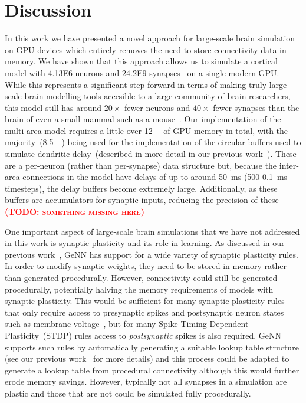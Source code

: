 \documentclass[9pt,twocolumn,twoside,lineno]{pnas-new}
\newcommand{\todo}[1]{\textbf{\textsc{\textcolor{red}{(TODO: #1)}}}}
\begin{document}
\section*{Discussion}
In this work we have presented a novel approach for large-scale brain simulation on GPU devices which entirely removes the need to store connectivity data in memory.
We have shown that this approach allows us to simulate a cortical model with \num{4.13E6} neurons and \num{24.2E9} synapses~\citep{Schmidt2018a,Schmidt2018} on a single modern GPU.
While this represents a significant step forward in terms of making truly large-scale brain modelling tools accesible to a large community of brain researchers, this model still has around $20\times$ fewer neurons and $40\times$ fewer synapses than the brain of even a small mammal such as a mouse~\citep{Herculano-Houzel2010}.
Our implementation of the multi-area model requires a little over \SI{12}{\giga\byte} of GPU memory in total, with the majority~(\SI{8.5}{\giga\byte}) being used for the implementation of the circular buffers used to simulate dendritic delay~(described in more detail in our previous work~\citep{Knight2018}).
These are a per-neuron (rather than per-synapse) data structure but, because the inter-area connections in the model have delays of up to around \SI{50}{\milli\second} (500 \SI{0.1}{\milli\second} timesteps), the delay buffers become extremely large.
Additionally, as these buffers are accumulators for synaptic inputs, reducing the precision of these \todo{something missing here}

One important aspect of large-scale brain simulations that we have not addressed in this work is synaptic plasticity and its role in learning.
As discussed in our previous work~\citep{Knight2018}, GeNN has support for a wide variety of synaptic plasticity rules.
In order to modify synaptic weights, they need to be stored in memory rather than generated procedurally.
However, connectivity could still be generated procedurally, potentially halving the memory requirements of models with synaptic plasticity.
This would be sufficient for many synaptic plasticity rules that only require access to presynaptic spikes and postsynaptic neuron states such as membrane voltage~\cite{Brader2007,Clopath2010c}, but for many Spike-Timing-Dependent Plasticity~(STDP) rules access to \emph{postsynaptic} spikes is also required.
GeNN supports such rules by automatically generating a suitable lookup table structure (see our previous work~\citep{Knight2018} for more details) and this process could be adapted to generate a lookup table from procedural connectivity although this would further erode memory savings.
However, typically not all synapses in a simulation are plastic and those that are not could be simulated fully procedurally.
\end{document}
